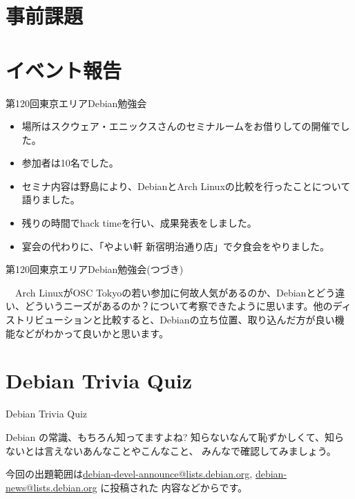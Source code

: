 \section{事前課題}
{\footnotesize

}

\section{イベント報告}

\begin{frame}{第120回東京エリアDebian勉強会}

\begin{itemize}
\item 場所はスクウェア・エニックスさんのセミナルームをお借りしての開催でした。
\item 参加者は10名でした。
\item セミナ内容は野島により、DebianとArch Linuxの比較を行ったことについて語りました。
\item 残りの時間でhack timeを行い、成果発表をしました。
\item 宴会の代わりに、「やよい軒 新宿明治通り店」で夕食会をやりました。
\end{itemize} 
  
\end{frame}

\begin{frame}{第120回東京エリアDebian勉強会(つづき)}

　Arch LinuxがOSC Tokyoの若い参加に何故人気があるのか、Debianとどう違い、どういうニーズがあるのか？について考察できたように思います。他のディストリビューションと比較すると、Debianの立ち位置、取り込んだ方が良い機能などがわかって良いかと思います。
  
\end{frame}


\section{Debian Trivia Quiz}
\begin{frame}{Debian Trivia Quiz}

  Debian の常識、もちろん知ってますよね?
知らないなんて恥ずかしくて、知らないとは言えないあんなことやこんなこと、
みんなで確認してみましょう。

今回の出題範囲は\url{debian-devel-announce@lists.debian.org},
\url{debian-news@lists.debian.org} に投稿された
内容などからです。

\end{frame}

